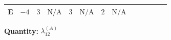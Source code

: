 \documentclass[8pt]{article}
\begin{document}
\begin{landscape}
\begin{longtable}{@{}llcccccc >{\raggedright\arraybackslash}p{0.21\linewidth} >{\raggedright\arraybackslash}p{0.21\linewidth} >{\raggedright\arraybackslash}p{0.21\linewidth}@{}}
\midrule
E & $-4$ & $3$ & $\text{N/A}$ & $3$ & $\text{N/A}$ & $2$ & $\text{N/A}$ & \scriptsize\adjustbox{max width=\linewidth}{$\begin{gathered} -\frac{2}{9} {\lambda_5} \left({\lambda_5}\right)^{*}\end{gathered}$} & \scriptsize\adjustbox{max width=\linewidth}{$\begin{gathered} +{g_1}^2 \left(16 {g_2}^2-30 {\lambda_{12}^{(A)}}\right)\end{gathered}$} & \scriptsize\adjustbox{max width=\linewidth}{$\begin{gathered} -24 {g_2}^2 {\lambda_{12}^{(A)}}\end{gathered}$} \\
\midrule
\bottomrule
\end{longtable}
\clearpage
\noindent\textbf{Quantity: }$\lambda_{12}^{(A)}$\par\smallskip

\end{landscape}
\end{document}
